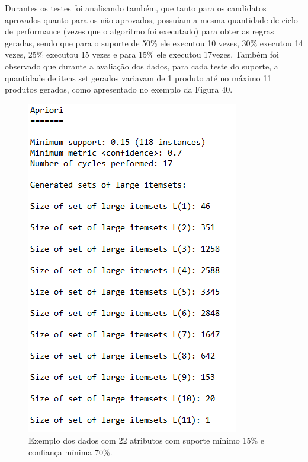 \par
Durantes os testes foi analisando também, que tanto para os candidatos aprovados quanto para os não aprovados, possuíam a mesma quantidade de ciclo de performance (vezes que o algoritmo foi executado) para obter as regras geradas, sendo que para o suporte de 50\% ele executou 10 vezes, 30\% executou 14 vezes, 25\% executou 15 vezes e para 15\% ele executou 17vezes. Também foi observado que durante a avaliação dos dados, para cada teste do suporte, a quantidade de itens set gerados variavam de 1 produto até no máximo 11 produtos gerados, como apresentado no exemplo da Figura 40.


\par
\begin{figure}[!htp]
	\begin{center}
    \caption{\label{fig:waveform_fig} Exemplo dos dados com 22 atributos com suporte mínimo 15\% e confiança mínima 70\%.}
	\includegraphics[scale=0.90]{Figuras/Resultados_valores_apriori.png}
	\end{center}
\end{figure}

\par
\textcolor{red}{}

\par
\textcolor{red}{}

\par
\textcolor{red}{}

\par
\textcolor{red}{}

\par
\textcolor{red}{}

\par
\textcolor{red}{}